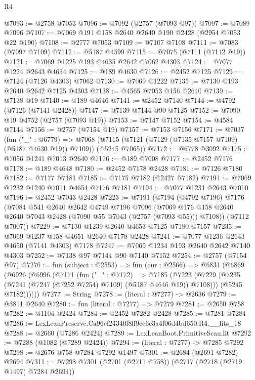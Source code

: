 \begin{lexlean}{R4}
\begin{coremodule}
@7093 := @2758 @7053
@7096 := @7092 (@2757 (@7093 @97))
@7097 := @7089 @7096
@7107 := @7069 @191 @158 @2640 @2640 @190 @2428 (@2954 @7053 @22 @190)
@7108 := @2777 @7053
@7109 := @7107 @7108
@7111 := @7083 (@7097 @7109)
@7112 := @5187 @4599
@7115 := @7075 (@7111 (@7112 @19))
@7121 := @7069 @1225 @193 @4635 @2642 @7062 @4303
@7124 := @7077 @1224 @2643 @4634
@7125 := @189 @4630
@7126 := @2452 @7125
@7129 := @7124 (@7126 @4303) @7062
@7130 := @7069 @1222
@7135 := @7130 @193 @2640 @2642 @7125 @4303
@7138 := @4565 @7053 @156 @2640
@7139 := @7138 @19
@7140 := @189 @4646
@7141 := @2452 @7140
@7144 := @4792 (@7126 (@7141 @2428))
@7147 := @7139 @7144 @90 @7125
@7152 := @7090 @19 @4752 (@2757 (@7093 @19))
@7153 := @7147 @7152
@7154 := @4584 @7144
@7156 := @2757 (@7154 @19)
@7157 := @7153 @7156
@7171 := @7037
    (fun ("_" : @6779) =>
    @7068 (@7115 (@7121 (@7129 (@7135 @7157 @7109) (@5187 @4630 @19)) @7109)) (@5245 @7065))
@7172 := @6778 @3092
@7175 := @7056 @1241 @7013 @2640
@7176 := @189 @7008
@7177 := @2452 @7176
@7178 := @189 @4648
@7180 := @2452 @7178 @2428
@7181 := @7126 @7180
@7182 := @7177 @7181
@7185 := @7175 @7182 (@2427 @7182)
@7191 := @7069 @1232 @1240 @7011 @4654 @7176 @7181
@7194 := @7077 @1231 @2643 @7010
@7196 := @2452 @7043 @2428
@7223 := @7191
    (@7194
      (@4792 @7196)
      @7176
      (@7084
        @541
        @2640
        @2642
        @4749
        @7196
        @7096
        (@7069 @176 @158 @2640 @2640 @7043 @2428 (@7090 @55 @7043 (@2757 (@7093 @55))) @7108))
      (@7112 @7007))
@7229 := @7130 @1239 @2640 @4653 @7125 @7180 @7157
@7235 := @7069 @1237 @158 @4651 @2640 @7178 @2428
@7241 := @7077 @1236 @2643 @4650 (@7141 @4303) @7178
@7247 := @7069 @1234 @193 @2640 @2642 @7140 @4303
@7252 := @7138 @97 @7144 @90 @7140 @7152
@7254 := @2757 (@7154 @97)
@7276 := fun (subject : @2553) =>
  fun (cur : @2566) =>
  @6831
    (@6869
      (@6926
        (@6996
          (@7171
            (fun ("_" : @7172) =>
            @7185
              (@7223 (@7229 (@7235 (@7241 (@7247 (@7252 @7254) @7109) (@5187 @4646 @19)) @7108)))
              (@5245 @7182))))))
@7277 := String
@7278 := (literal : @7277) -> @2636
@7279 := @3811 @2640
@7280 := fun (literal : @7277) => @7279
@7281 := @2650 @758
@7282 := @1104 @2424
@7284 := @2452 @7282 @2428
@7285 := @7281 @7284
@7286 := LexLeanPreserve.Ca96cf24340f8ff9cc6c3a4f06d4bd650.R4.__fits_18
@7288 := @2660 (@7286 @2424)
@7289 := LexLeanBoot.PrimitiveScan.lit
@7292 := @7288 (@1082 (@7289 @2424))
@7294 := (literal : @7277) -> @7285 @7292
@7298 := @2676 @758 @7284 @7292 @1497
@7301 := @2684 (@2691 @7282) @2694
@7311 := @7298 @7301 (@2701 (@2711 @758)) (@2717 (@2718 (@2719 @1497) @7284 @2694))

\end{coremodule}
\end{lexlean}

